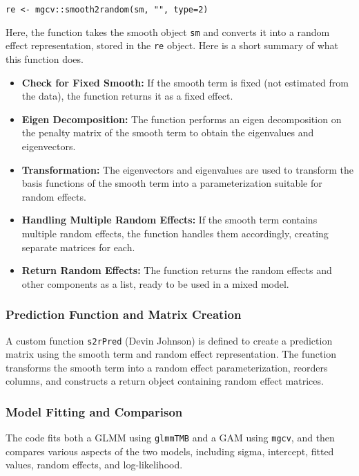 \documentclass{article}
\begin{document}
\begin{verbatim}
re <- mgcv::smooth2random(sm, "", type=2)
\end{verbatim}

Here, the function takes the smooth object \texttt{sm} and converts it into a random effect representation, stored in the \texttt{re} object. Here is a short summary of what this function does.

\begin{itemize}
    \item \textbf{Check for Fixed Smooth:} If the smooth term is fixed (not estimated from the data), the function returns it as a fixed effect.
    \item \textbf{Eigen Decomposition:} The function performs an eigen decomposition on the penalty matrix of the smooth term to obtain the eigenvalues and eigenvectors.
    \item \textbf{Transformation:} The eigenvectors and eigenvalues are used to transform the basis functions of the smooth term into a parameterization suitable for random effects.
    \item \textbf{Handling Multiple Random Effects:} If the smooth term contains multiple random effects, the function handles them accordingly, creating separate matrices for each.
    \item \textbf{Return Random Effects:} The function returns the random effects and other components as a list, ready to be used in a mixed model.
\end{itemize}


\subsubsection{Prediction Function and Matrix Creation}
A custom function \texttt{s2rPred} (Devin Johnson) is defined to create a prediction matrix using the smooth term and random effect representation. The function transforms the smooth term into a random effect parameterization, reorders columns, and constructs a return object containing random effect matrices.

\subsubsection{Model Fitting and Comparison}
The code fits both a GLMM using \texttt{glmmTMB} and a GAM using \texttt{mgcv}, and then compares various aspects of the two models, including sigma, intercept, fitted values, random effects, and log-likelihood.
\end{document}
